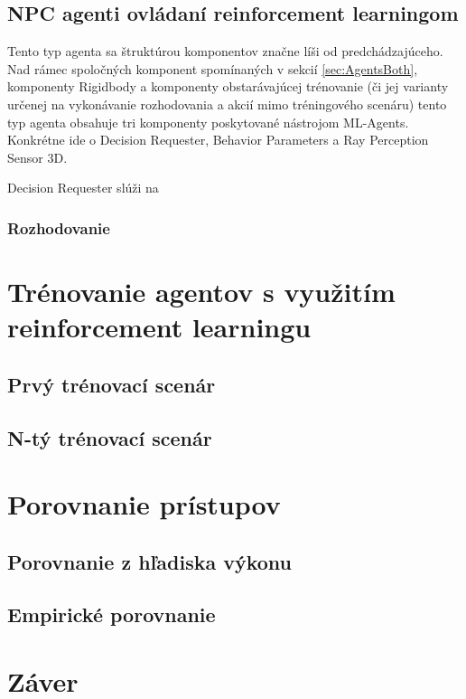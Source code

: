 \documentclass[slovak, master]{diploma}
\begin{document}
\section{NPC agenti ovládaní reinforcement learningom}
\label{sec:AgentsWithBrain}
Tento typ agenta sa štruktúrou komponentov značne líši od predchádzajúceho. Nad rámec spoločných komponent spomínaných v sekcií \ref{sec:AgentsBoth}, komponenty Rigidbody a komponenty obstarávajúcej trénovanie (či jej varianty určenej na vykonávanie rozhodovania a akcií mimo tréningového scenáru) tento typ agenta obsahuje tri komponenty poskytované nástrojom ML-Agents. Konkrétne ide o Decision Requester, Behavior Parameters a Ray Perception Sensor 3D.

Decision Requester slúži na %


\subsection{Rozhodovanie}
\label{sec:ImplReinforcementLearningMLAgent}

\chapter{Trénovanie agentov s využitím reinforcement learningu}
\label{sec:Training}
\section{Prvý trénovací scenár}
\label{sec:FirstScenario}
\section{N-tý trénovací scenár}
\label{sec:LastScenario}

\chapter{Porovnanie prístupov}
\label{sec:ImplReinforcement learning}
\section{Porovnanie z hľadiska výkonu}
\label{sec:Performance}
\section{Empirické porovnanie}
\label{sec:Gameplay}

\chapter{Záver}
\label{sec:Conclusion}

%

\printbibliography[title={Literatúra}, heading=bibintoc]
\end{document}
